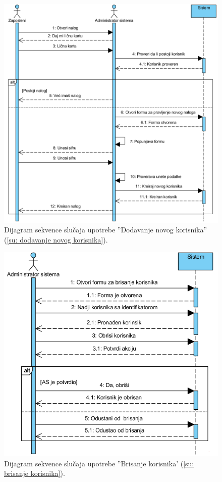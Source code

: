 \begin{figure}[H]
	\centering
	\includegraphics[width=0.6\paperwidth]{dijagrami/dijagrami-sekvence/dodavanje-novog-korisnika.png}
	\caption{Dijagram sekvence slu\v caja upotrebe ''Dodavanje novog korisnika'' (\ref{su: dodavanje novog korisnika}).}
\end{figure}

\newpage

\begin{figure}[H]
	\centering
	\includegraphics[width=0.7\paperwidth]{dijagrami/dijagrami-sekvence/brisanje-korisnika.png}
	\caption{Dijagram sekvence slu\v caja upotrebe ''Brisanje korisnika' (\ref{su: brisanje korisnika}).}
\end{figure}

